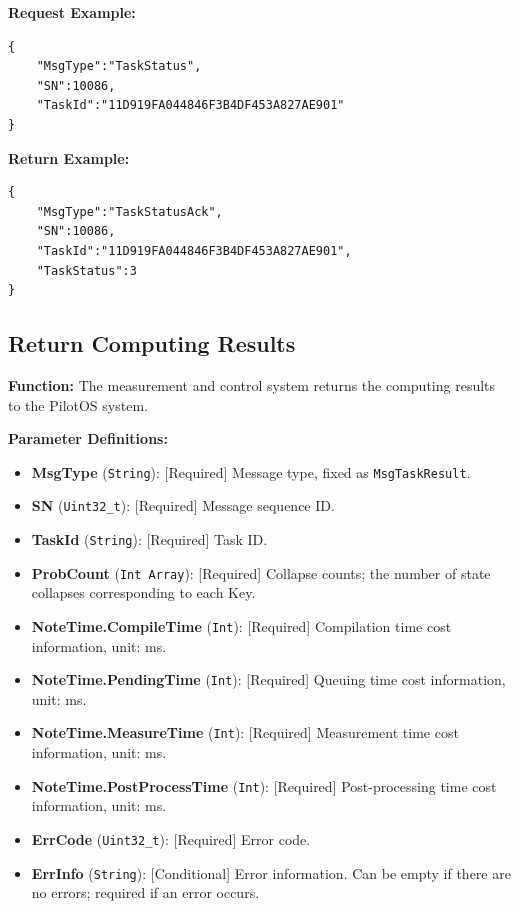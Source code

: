 \documentclass[12pt, a4paper]{article}
\begin{document}
\noindent \textbf{Request Example:}
\begin{lstlisting}
{
    "MsgType":"TaskStatus",
    "SN":10086,
    "TaskId":"11D919FA044846F3B4DF453A827AE901"
}
\end{lstlisting}

\noindent \textbf{Return Example:}
\begin{lstlisting}
{
    "MsgType":"TaskStatusAck",
    "SN":10086,
    "TaskId":"11D919FA044846F3B4DF453A827AE901",
    "TaskStatus":3
}
\end{lstlisting}

\subsection{Return Computing Results}

\textbf{Function:} The measurement and control system returns the computing results to the PilotOS system.

\textbf{Parameter Definitions:}
\begin{itemize}
    \item \textbf{MsgType} (\texttt{String}): [Required] Message type, fixed as \texttt{MsgTaskResult}.
    \item \textbf{SN} (\texttt{Uint32\_t}): [Required] Message sequence ID.
    \item \textbf{TaskId} (\texttt{String}): [Required] Task ID.
    \item \textbf{ProbCount} (\texttt{Int Array}): [Required] Collapse counts; the number of state collapses corresponding to each Key.
    \item \textbf{NoteTime.CompileTime} (\texttt{Int}): [Required] Compilation time cost information, unit: ms.
    \item \textbf{NoteTime.PendingTime} (\texttt{Int}): [Required] Queuing time cost information, unit: ms.
    \item \textbf{NoteTime.MeasureTime} (\texttt{Int}): [Required] Measurement time cost information, unit: ms.
    \item \textbf{NoteTime.PostProcessTime} (\texttt{Int}): [Required] Post-processing time cost information, unit: ms.
    \item \textbf{ErrCode} (\texttt{Uint32\_t}): [Required] Error code.
    \item \textbf{ErrInfo} (\texttt{String}): [Conditional] Error information. Can be empty if there are no errors; required if an error occurs.
\end{itemize}
\end{document}
